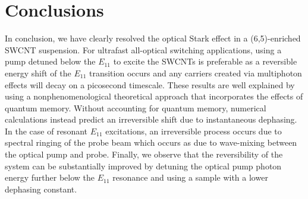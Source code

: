 \section{Conclusions}

In conclusion, we have clearly resolved the optical Stark effect in a (6,5)-enriched SWCNT suspension. For ultrafast all-optical switching applications, using a pump detuned below the $E_{11}$ to excite the SWCNTs is preferable as a reversible energy shift of the $E_{11}$ transition occurs and any carriers created via multiphoton effects will decay on a picosecond timescale. These results are well explained by using a nonphenomenological theoretical approach that incorporates the effects of quantum memory. Without accounting for quantum memory, numerical calculations instead predict an irreversible shift due to instantaneous dephasing. In the case of resonant $E_{11}$ excitations, an irreversible process occurs due to spectral ringing of the probe beam which occurs as due to wave-mixing between the optical pump and probe. Finally, we observe that the reversibility of the system can be substantially improved by detuning the optical pump photon energy further below the $E_{11}$ resonance and using a sample with a lower dephasing constant.
